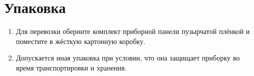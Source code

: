 \chapter{Упаковка}\label{ch:package-ru}

\begin{enumerate}
    \item Для перевозки оберните комплект приборной панели пузырчатой плёнкой и поместите в жёсткую картонную коробку.
    \item Допускается иная упаковка при условии, что она защищает приборку во время транспортировки и хранения.
\end{enumerate}
